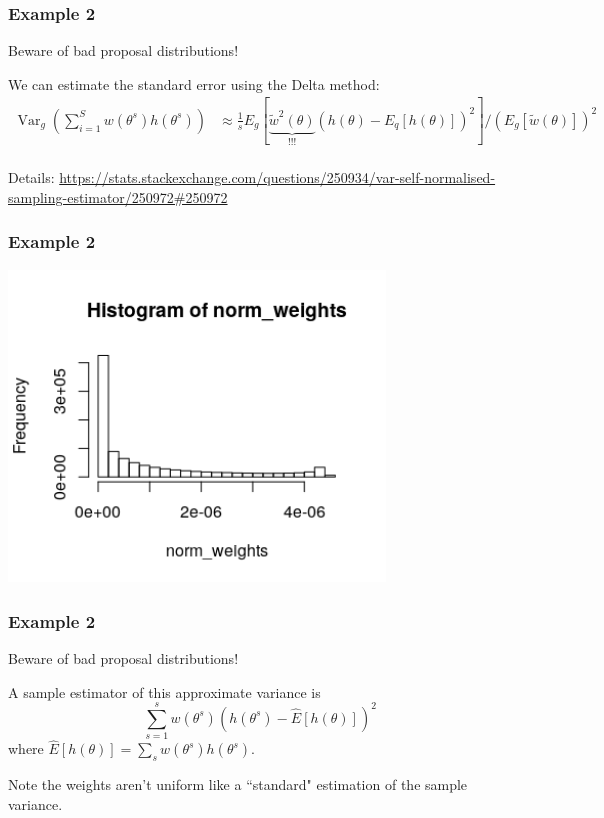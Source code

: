 \documentclass{beamer}
\begin{document}
\begin{frame}[fragile]
\frametitle{Example 2}

Beware of bad proposal distributions!
\newline

We can estimate the standard error using the Delta method:
\begin{align*}
\operatorname{Var}_g \left( \sum_{i=1}^S w(\theta^s) h(\theta^s) \right) &\approx \frac{1}{s} E_g\left[  \underbrace{ \tilde{w}^2(\theta) }_{\text{!!!} } (h(\theta) - E_q[h(\theta) ] )^2 \right] \bigg/ (E_g[\tilde{w}(\theta)])^2  \\
\end{align*}

Details: \url{https://stats.stackexchange.com/questions/250934/var-self-normalised-sampling-estimator/250972#250972}
\end{frame}

\begin{frame}[fragile]
\frametitle{Example 2}

\begin{center}
\includegraphics[width=100mm]{is_weights.png}
\end{center}

\end{frame}


\begin{frame}[fragile]
\frametitle{Example 2}

Beware of bad proposal distributions!
\newline

A sample estimator of this approximate variance is
\[
\sum_{s=1}^s w(\theta^s) \left( h(\theta^s) - \hat{E}[h(\theta)]  \right)^2
\]
where $\hat{E}[h(\theta)] = \sum_s w(\theta^s)h(\theta^s)$. 
\newline

Note the weights aren't uniform like a ``standard" estimation of the sample variance.

\end{frame}
\end{document}
